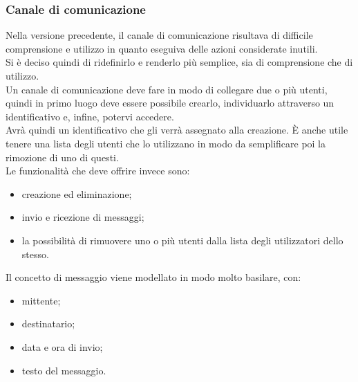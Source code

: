       \subsubsection*{Canale di comunicazione}
        Nella versione precedente, il canale di comunicazione risultava di difficile comprensione e utilizzo in quanto eseguiva delle azioni considerate inutili.\\
        Si è deciso quindi di ridefinirlo e renderlo più semplice, sia di comprensione che di utilizzo.\\
        Un canale di comunicazione deve fare in modo di collegare due o più utenti, quindi in primo luogo deve essere possibile crearlo, individuarlo attraverso un identificativo e, infine, potervi accedere.\\
        Avrà quindi un identificativo che gli verrà assegnato alla creazione. È anche utile tenere una lista degli utenti che lo utilizzano in modo da semplificare poi la rimozione di uno di questi.\\
        Le funzionalità che deve offrire invece sono:
        \begin{itemize}
          \item creazione ed eliminazione;
          \item invio e ricezione di messaggi;
          \item la possibilità di rimuovere uno o più utenti dalla lista degli utilizzatori dello stesso.
        \end{itemize}
        Il concetto di messaggio viene modellato in modo molto basilare, con:
        \begin{itemize}
          \item mittente;
          \item destinatario;
          \item data e ora di invio;
          \item testo del messaggio.
        \end{itemize}
      \newpage
